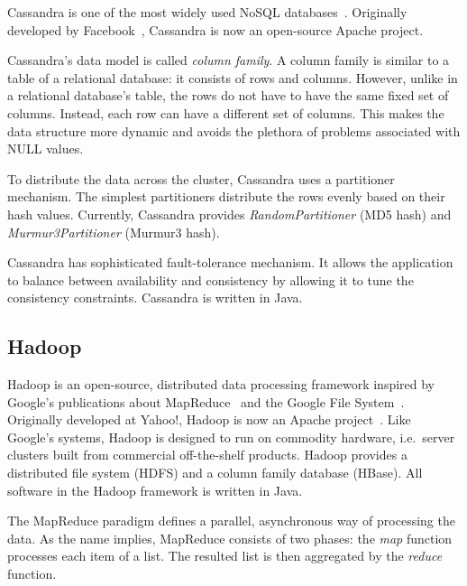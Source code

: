Cassandra %
is one of the most widely used NoSQL databases~\cite{Cassandra}. Originally developed by Facebook~\cite{Lakshman:2010:CDS:1773912.1773922}, Cassandra is now an open-source Apache project.

Cassandra's data model is called \emph{column family}. A column family is similar to a table of a relational database: it consists of rows and columns. However, unlike in a relational database's table, the rows do not have to have the same fixed set of columns. Instead, each row can have a different set of columns. This makes the data structure more dynamic and avoids the plethora of problems associated with NULL values.


To distribute the data across the cluster, Cassandra uses a partitioner mechanism. The simplest partitioners distribute the rows evenly based on their hash values. Currently, Cassandra provides \emph{RandomPartitioner} (MD5 hash) and \emph{Murmur3Partitioner} (Murmur3 hash).

Cassandra has sophisticated fault-tolerance mechanism. It allows the application to balance between availability and consistency by allowing it to tune the consistency constraints. Cassandra is written in Java.


\subsection{Hadoop}

Hadoop is an open-source, distributed data processing framework inspired by Google's publications about MapReduce~\cite{Dean:2008:MSD:1327452.1327492} and the Google File System~\cite{Ghemawat:2003:GFS:945445.945450}. Originally developed at Yahoo!, Hadoop is now an Apache project~\cite{Hadoop}. Like Google's systems, Hadoop is designed to run on commodity hardware, i.e.\ server clusters built from commercial off-the-shelf products. Hadoop provides a distributed file system (HDFS) and a column family database (HBase). All software in the Hadoop framework is written in Java.

The MapReduce paradigm defines a parallel, asynchronous way of processing the data. As the name implies, MapReduce consists of two phases: the \emph{map} function processes each item of a list. The resulted list is then aggregated by the \emph{reduce} function.

